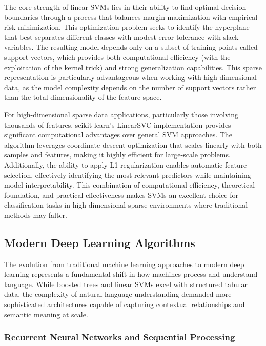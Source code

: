 \documentclass[
  titlepage]{article}
\begin{document}
The core strength of linear SVMs lies in their ability to find optimal
decision boundaries through a process that balances margin maximization
with empirical risk minimization. This optimization problem seeks to
identify the hyperplane that best separates different classes with
modest error tolerance with slack variables. The resulting model depends
only on a subset of training points called support vectors, which
provides both computational efficiency (with the exploitation of the
kernel trick) and strong generalization capabilities. This sparse
representation is particularly advantageous when working with
high-dimensional data, as the model complexity depends on the number of
support vectors rather than the total dimensionality of the feature
space.

For high-dimensional sparse data applications, particularly those
involving thousands of features, scikit-learn's LinearSVC implementation
provides significant computational advantages over general SVM
approaches. The algorithm leverages coordinate descent optimization that
scales linearly with both samples and features, making it highly
efficient for large-scale problems. Additionally, the ability to apply
L1 regularization enables automatic feature selection, effectively
identifying the most relevant predictors while maintaining model
interpretability. This combination of computational efficiency,
theoretical foundation, and practical effectiveness makes SVMs an
excellent choice for classification tasks in high-dimensional sparse
environments where traditional methods may falter.

\subsection{Modern Deep Learning
Algorithms}\label{modern-deep-learning-algorithms}

The evolution from traditional machine learning approaches to modern
deep learning represents a fundamental shift in how machines process and
understand language. While boosted trees and linear SVMs excel with
structured tabular data, the complexity of natural language
understanding demanded more sophisticated architectures capable of
capturing contextual relationships and semantic meaning at scale.

\subsubsection{Recurrent Neural Networks and Sequential
Processing}\label{recurrent-neural-networks-and-sequential-processing}
\end{document}
